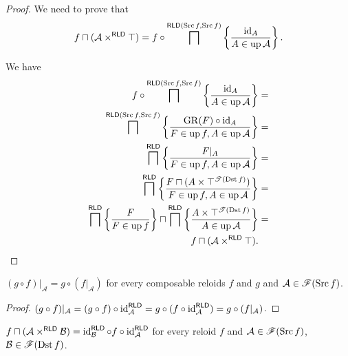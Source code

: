 \begin{proof}
We need to prove that 
\[
f\sqcap(\mathcal{A}\times^{\mathsf{RLD}}\top)=f\circ\bigsqcap^{\mathsf{RLD}(\operatorname{Src} f,\operatorname{Src} f)}\left\{ \frac{\operatorname{id}_{A}}{A\in\operatorname{up}\mathcal{A}}\right\}.
\]


We have
\begin{align*}
f\circ\bigsqcap^{\mathsf{RLD}(\operatorname{Src} f,\operatorname{Src} f)}\left\{ \frac{\operatorname{id}_{A}}{A\in\operatorname{up}\mathcal{A}}\right\} & =\\
\bigsqcap^{\mathsf{RLD}(\operatorname{Src} f,\operatorname{Src} f)}\left\{ \frac{\operatorname{GR}(F)\circ\operatorname{id}_{A}}{F\in\operatorname{up} f,A\in\operatorname{up}\mathcal{A}}\right\} & =\\
\bigsqcap^{\mathsf{RLD}}\left\{ \frac{F|_{A}}{F\in\operatorname{up} f,A\in\operatorname{up}\mathcal{A}}\right\} & =\\
\bigsqcap^{\mathsf{RLD}}\left\{ \frac{F\sqcap(A\times\top^{\mathscr{T}(\operatorname{Dst} f)})}{F\in\operatorname{up} f,A\in\operatorname{up}\mathcal{A}}\right\} & =\\
\bigsqcap^{\mathsf{RLD}}\left\{ \frac{F}{F\in\operatorname{up} f}\right\}\sqcap\bigsqcap^{\mathsf{RLD}}\left\{ \frac{A\times\top^{\mathscr{T}(\operatorname{Dst} f)}}{A\in\operatorname{up}\mathcal{A}}\right\} & =\\
f\sqcap(\mathcal{A}\times^{\mathsf{RLD}}\top).
\end{align*}
\end{proof}
\begin{thm}
$(g\circ f)|_{\mathcal{A}}=g\circ(f|_{\mathcal{A}})$ for every composable
reloids $f$ and $g$ and $\mathcal{A}\in\mathscr{F}(\operatorname{Src} f)$.\end{thm}
\begin{proof}
$(g\circ f)|_{\mathcal{A}}=(g\circ f)\circ\operatorname{id}_{\mathcal{A}}^{\mathsf{\mathsf{RLD}}}=g\circ(f\circ\operatorname{id}_{\mathcal{A}}^{\mathsf{\mathsf{RLD}}})=g\circ(f|_{\mathcal{A}})$.\end{proof}
\begin{thm}
$f\sqcap(\mathcal{A}\times^{\mathsf{RLD}}\mathcal{B})=\operatorname{id}_{\mathcal{B}}^{\mathsf{\mathsf{RLD}}}\circ f\circ\operatorname{id}_{\mathcal{A}}^{\mathsf{\mathsf{RLD}}}$
for every reloid $f$ and $\mathcal{A}\in\mathscr{F}(\operatorname{Src} f)$, $\mathcal{B}\in\mathscr{F}(\operatorname{Dst} f)$.\end{thm}
